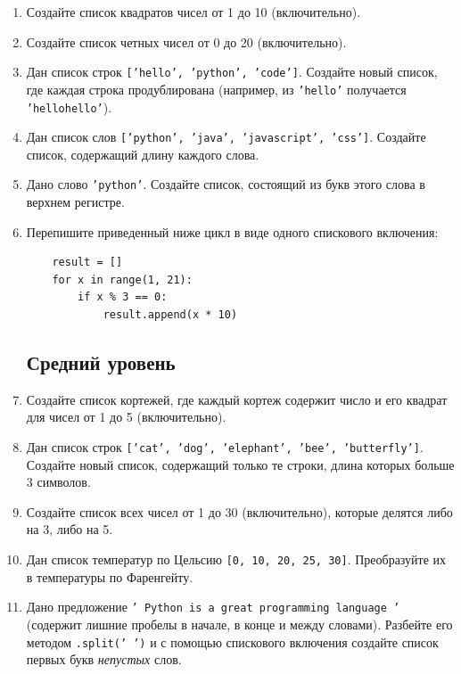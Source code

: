 \documentclass[a4,12pt]{article}
\theoremstyle{remark}
\begin{document}
\begin{enumerate}
    \subsection*{Начальный уровень}
    \item Создайте список квадратов чисел от 1 до 10 (включительно).
    \item Создайте список четных чисел от 0 до 20 (включительно).
    \item Дан список строк \texttt{['hello', 'python', 'code']}. Создайте новый список, где каждая строка продублирована (например, из \texttt{'hello'} получается \texttt{'hellohello'}).
    \item Дан список слов \texttt{['python', 'java', 'javascript', 'css']}. Создайте список, содержащий длину каждого слова.
    \item Дано слово \texttt{'python'}. Создайте список, состоящий из букв этого слова в верхнем регистре.

    \item Перепишите приведенный ниже цикл в виде одного спискового включения:
    \begin{center}
    \begin{minipage}{0.7\textwidth}
    \begin{verbatim}
    result = []
    for x in range(1, 21):
        if x % 3 == 0:
            result.append(x * 10)
    \end{verbatim}
    \end{minipage}
    \end{center}

    \subsection*{Средний уровень}
    \item Создайте список кортежей, где каждый кортеж содержит число и его квадрат для чисел от 1 до 5 (включительно).
    \item Дан список строк \texttt{['cat', 'dog', 'elephant', 'bee', 'butterfly']}. Создайте новый список, содержащий только те строки, длина которых больше 3 символов.
    \item Создайте список всех чисел от 1 до 30 (включительно), которые делятся либо на 3, либо на 5.
    \item Дан список температур по Цельсию \texttt{[0, 10, 20, 25, 30]}. Преобразуйте их в температуры по Фаренгейту.

    \item Дано предложение \texttt{'  Python  is a  great programming  language  '}
    (содержит лишние пробелы в начале, в конце и между словами).
    Разбейте его методом \texttt{.split(' ')} и с помощью спискового включения
    создайте список первых букв \emph{непустых} слов.


\end{enumerate}
\end{document}
